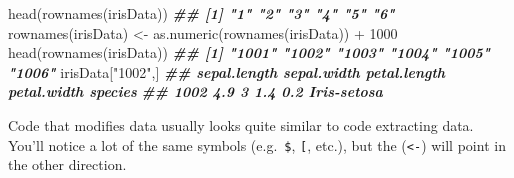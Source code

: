 \documentclass[
  12pt,
  krantz2]{krantz}
\makeatletter
\newenvironment{Shaded}{\begin{snugshade}}{\end{snugshade}}
\newcommand{\AttributeTok}[1]{\textcolor[rgb]{0.61,0.61,0.61}{#1}}
\newcommand{\CommentTok}[1]{\textcolor[rgb]{0.37,0.37,0.37}{\textit{#1}}}
\newcommand{\ConstantTok}[1]{\textcolor[rgb]{0,0,0}{#1}}
\newcommand{\DecValTok}[1]{\textcolor[rgb]{0.06,0.06,0.06}{#1}}
\newcommand{\DocumentationTok}[1]{\textcolor[rgb]{0.37,0.37,0.37}{\textbf{\textit{#1}}}}
\newcommand{\FunctionTok}[1]{\textcolor[rgb]{0,0,0}{#1}}
\newcommand{\NormalTok}[1]{#1}
\newcommand{\OtherTok}[1]{\textcolor[rgb]{0.37,0.37,0.37}{#1}}
\newcommand{\SpecialCharTok}[1]{\textcolor[rgb]{0,0,0}{#1}}
\newcommand{\StringTok}[1]{\textcolor[rgb]{0.5,0.5,0.5}{#1}}
\newenvironment{kframe}{%
\medskip{}
\setlength{\fboxsep}{.8em}
 \def\at@end@of@kframe{}%
 \ifinner\ifhmode%
  \def\at@end@of@kframe{\end{minipage}}%
  \begin{minipage}{\columnwidth}%
 \fi\fi%
 \def\FrameCommand##1{\hskip\@totalleftmargin \hskip-\fboxsep
 \colorbox{shadecolor}{##1}\hskip-\fboxsep
     \hskip-\linewidth \hskip-\@totalleftmargin \hskip\columnwidth}%
 \MakeFramed {\advance\hsize-\width
   \@totalleftmargin\z@ \linewidth\hsize
   \@setminipage}}%
 {\par\unskip\endMakeFramed%
 \at@end@of@kframe}
\renewenvironment{Shaded}{\begin{kframe}}{\end{kframe}}
\makeatother
\begin{document}
\begin{Shaded}
\begin{Highlighting}[]
\FunctionTok{head}\NormalTok{(}\FunctionTok{rownames}\NormalTok{(irisData))}
\DocumentationTok{\#\# [1] "1" "2" "3" "4" "5" "6"}
\FunctionTok{rownames}\NormalTok{(irisData) }\OtherTok{\textless{}{-}} \FunctionTok{as.numeric}\NormalTok{(}\FunctionTok{rownames}\NormalTok{(irisData)) }\SpecialCharTok{+} \DecValTok{1000}
\FunctionTok{head}\NormalTok{(}\FunctionTok{rownames}\NormalTok{(irisData))}
\DocumentationTok{\#\# [1] "1001" "1002" "1003" "1004" "1005" "1006"}
\NormalTok{irisData[}\StringTok{"1002"}\NormalTok{,]}
\DocumentationTok{\#\#      sepal.length sepal.width petal.length petal.width     species}
\DocumentationTok{\#\# 1002          4.9           3          1.4         0.2 Iris{-}setosa}
\end{Highlighting}
\end{Shaded}

Code that modifies data usually looks quite similar to code extracting data. You'll notice a lot of the same symbols (e.g.~\texttt{\$}, \texttt{{[}}, etc.), but the (\texttt{\textless{}-}) will point in the other direction.

\begin{Shaded}
\end{Shaded}
\end{document}
